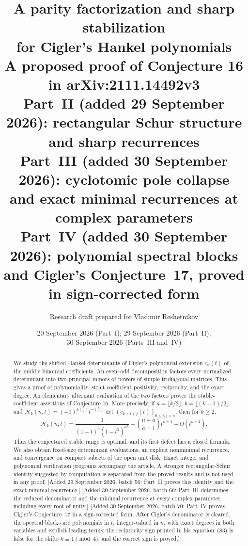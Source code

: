 \documentclass[11pt]{article}
\title{\color{Ink}\LARGE A parity factorization and sharp stabilization\\[0.25em]
for Cigler's Hankel polynomials\\[0.5em]
\large A proposed proof of Conjecture 16 in arXiv:2111.14492v3\\[0.6em]
\normalsize Part~II (added 29 September 2026): rectangular Schur structure\\
\normalsize and sharp recurrences\\[0.3em]
\normalsize Part~III (added 30 September 2026): cyclotomic pole collapse\\
\normalsize and exact minimal recurrences at complex parameters\\[0.3em]
\normalsize Part~IV (added 30 September 2026): polynomial spectral blocks\\
\normalsize and Cigler's Conjecture~17, proved in sign-corrected form}
\author{Research draft prepared for Vladimir Reshetnikov}
\date{20 September 2026 (Part~I); 29 September 2026 (Part~II);\\
30 September 2026 (Parts~III and~IV)}
\theoremstyle{definition}
\theoremstyle{remark}
\newcommand{\Ht}{\mathcal H}
\theoremstyle{definition}
\theoremstyle{plain}
\numberwithin{equation}{section}
\begin{document}
\maketitle
\thispagestyle{empty}
\begin{abstract}
We study the shifted Hankel determinants of Cigler's polynomial extension
$c_n(t)$ of the middle binomial coefficients. An even--odd decomposition
factors every normalized determinant into two principal minors of powers of
simple tridiagonal matrices. This gives a proof of polynomiality, strict
coefficient positivity, reciprocity, and the exact degree. An elementary
alternant evaluation of the two factors proves the stable-coefficient
assertions of Conjecture 16. More precisely, if
$a=\lfloor k/2\rfloor$, $b=\lfloor(k-1)/2\rfloor$, and
$\Ht_k(n;t)=(-1)^{k\binom n2}t^{-\binom n2}
\det(c_{k+i+j}(t))_{0\le i,j<n}$, then for $k\ge2$,
\[
\Ht_k(n;t)=\frac{1}{(1-t)^a(1-t^2)^{ab}}
-\binom{n+a}{a-1}t^{n+1}+O(t^{n+2}).
\]
Thus the conjectured stable range is optimal, and its first defect has a
closed formula. We also obtain fixed-size determinant evaluations, an
explicit nonminimal recurrence, and convergence on compact subsets of the
open unit disk. Exact integer and polynomial verification programs accompany
the article. A stronger rectangular-Schur identity suggested by computation
is separated from the proved results and is not used in any proof.
[Added 29 September 2026, batch 56: Part~II proves this identity and the
exact minimal recurrence.]
[Added 30 September 2026, batch 66: Part~III determines the reduced
denominator and the minimal recurrence at every complex parameter,
including every root of unity.]
[Added 30 September 2026, batch 70: Part~IV proves Cigler's
Conjecture~17 in a sign-corrected form. After Cigler's denominator is
cleared, the spectral blocks are polynomials in $t$, integer-valued in
$n$, with exact degrees in both variables and explicit leading terms;
the reciprocity sign printed in his equation~(83) is false for the shifts
$k\equiv1\pmod4$, and the correct sign is proved.]
\end{abstract}

\medskip
\noindent{}
\end{document}
